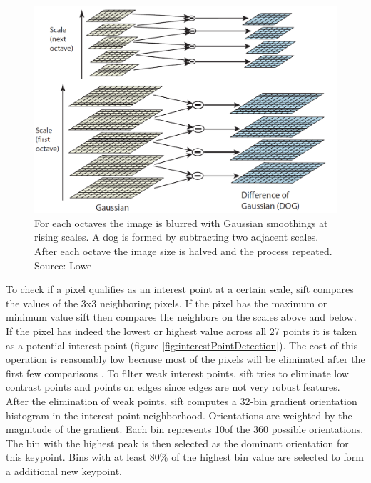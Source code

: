 \begin{figure}[ht]
	\centering
	\includegraphics[scale=0.3]{figures/theorySIFT_dogScaleFiltering}
	\caption{For each octaves the image is blurred with Gaussian smoothings at rising scales. A \gls{dog} is formed by subtracting two adjacent scales. After each octave the image size is halved and the process repeated. Source: Lowe \cite{Lowe2004}}
	\label{fig:dogScaleFiltering}
\end{figure}

To check if a pixel qualifies as an interest point at a certain scale, \gls{sift} compares the values of the 3x3 neighboring pixels. If the pixel has the maximum or minimum value \gls{sift} then compares the neighbors on the scales above and below. If the pixel has indeed the lowest or highest value across all 27 points it is taken as a potential interest point {(figure \ref{fig:interestPointDetection})}. The cost of this operation is reasonably low because most of the pixels will be eliminated after the first few comparisons \cite{Lowe2004}. To filter weak interest points, \gls{sift} tries to eliminate low contrast points and points on edges since edges are not very robust features. After the elimination of weak points, \gls{sift} computes a 32-bin gradient orientation histogram in the interest point neighborhood. Orientations are weighted by the magnitude of the gradient. Each bin represents 10\degree of the 360 possible orientations. The bin with the highest peak is then selected as the dominant orientation for this keypoint. Bins with at least 80\% of the highest bin value are selected to form a additional new keypoint.

